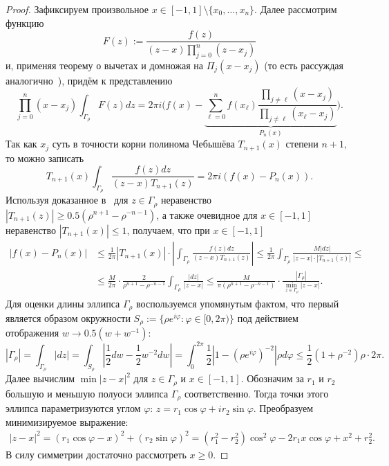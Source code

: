 \documentclass[3p]{cmmp}%
\numberwithin{equation}{section}
\begin{document}
\begin{proof}
	Зафиксируем произвольное $x \in [-1,1]\setminus\{x_0, \dots, x_n\}$. 
	Далее рассмотрим функцию
	\[F(z) := \frac{f(z)}{(z-x)\prod_{j=0}^n(z-x_j)}\]
	и, применяя теорему о вычетах и домножая на $\Pi_j(x-x_j)$ (то есть рассуждая аналогично~\cite[Теорема~13.6]{MNA}), придём к представлению
	\[\prod_{j = 0}^n (x-x_j)\int_{\Gamma_{\rho}}F(z)dz = 2\pi i \Biggl( f(x) - \underbrace{\sum_{\ell=0}^n f(x_\ell) \frac{\prod_{j \neq \ell}(x-x_j)}{\prod_{j \neq \ell}(x_\ell - x_j)}}_{P_n(x)} \Biggr).\]
	Так как $x_j$ суть в точности корни полинома Чебышёва $T_{n+1}(x)$ степени $n+1$, то можно записать 
	\[
	T_{n+1}(x)\int_{\Gamma_{\rho}}\frac{f(z)dz}{(z-x)T_{n+1}(z)} = 2\pi i (f(x) - P_n(x)).
	\]
	Используя доказанное в~\cite[Теорема~13.6]{MNA} для $z \in \Gamma_{\rho}$ неравенство $|T_{n+1}(z)| \geq 0.5(\rho^{n+1}-\rho^{-n-1})$, а также очевидное для $x\in[-1,1]$ неравенство $|T_{n+1}(x)| \leq 1$, получаем, что при $x \in [-1,1]$
	\begin{align*}
	\left|f(x)-P_n(x)\right| 
	&\leq \frac{1}{2\pi}|T_{n+1}(x)| \cdot \left|\int_{\Gamma_{\rho}} \frac{f(z)dz}{(z-x)T_{n+1}(z)}\right| 
	\leq \frac{1}{2\pi} \int_{\Gamma_{\rho}} \frac{M|dz|}{|z-x|\cdot |T_{n+1}(z)|} \le\\
	&\leq \frac{M}{2\pi}\cdot \frac{2}{\rho^{n+1} - {\rho^{-n-1}}} \int_{\Gamma_{\rho}} \frac{|dz|}{|z-x|} \leq \frac{M}{\pi(\rho^{n+1}-\rho^{-n-1})}\cdot \frac{|\Gamma_{\rho}|}{\min_{\,z\in\Gamma_\rho}|z-x|}.
	\end{align*}
	Для оценки длины эллипса $\Gamma_\rho$ воспользуемся упомянутым фактом, что первый является образом окружности $S_\rho := \{\rho e^{i\varphi}:\varphi \in [0, 2\pi)\}$ под действием отображения $w \to 0.5(w + w^{-1})$:
	\[|\Gamma_{\rho}| 
	= \int_{\Gamma_{\rho}}|dz|
	= \int_{S_\rho} \left|\frac{1}{2}dw - \frac{1}{2}w^{-2}dw\right|
	= \int_0^{2	\pi}\frac{1}{2}\left|1-(\rho e^{i\varphi})^{-2}\right| \rho d \varphi \leq \frac{1}{2}(1+\rho^{-2})\rho \cdot 2\pi.\]
	Далее вычислим $\min|z-x|^2$ для $z \in \Gamma_{\rho}$ и $x \in [-1,1]$. Обозначим за $r_1$ и $r_2$ большую и меньшую полуоси эллипса $\Gamma_\rho$ соответственно. Тогда точки этого эллипса параметризуются углом $\varphi$: $z = r_1\cos \varphi + ir_2\sin \varphi$.
	Преобразуем минимизируемое выражение:
	\begin{align}\label{eq:z-x}
	|z-x|^2 = (r_1\cos \varphi - x)^2 + (r_2\sin\varphi)^2 = (r_1^2-r_2^2)\cos ^2 \varphi - 2r_1x \cos \varphi + x^2 + r_2^2.
	\end{align}
	В силу симметрии достаточно рассмотреть $x \ge 0$.

\end{proof}
\end{document}
